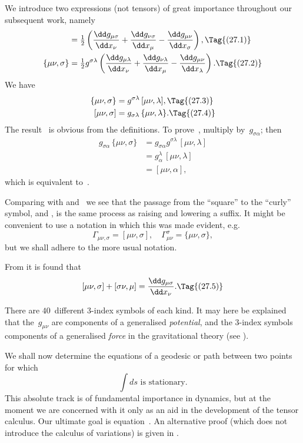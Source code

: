 \documentclass[12pt]{book}
\begin{document}
We introduce two expressions (not tensors) of great importance throughout
our subsequent work, namely
\begin{align*}
  [\mu\nu, \sigma]
  &= \tfrac{1}{2} \left(\frac{\dd g_{\mu\sigma}}{\dd x_{\nu}} + \frac{\dd g_{\nu\sigma}}{\dd x_{\mu}} - \frac{\dd g_{\mu\nu}}{\dd x_{\sigma}}\right),
  \Tag{(27.1)} \\
  \{\mu\nu, \sigma\}
  &= \tfrac{1}{2} g^{\sigma\lambda} \left(\frac{\dd g_{\mu\lambda}}{\dd x_{\nu}} + \frac{\dd g_{\nu\lambda}}{\dd x_{\mu}} - \frac{\dd g_{\mu\nu}}{\dd x_{\lambda}}\right).
\Tag{(27.2)}
\end{align*}
We have
\begin{align*}
  \{\mu\nu, \sigma\} &= g^{\sigma\lambda}\, [\mu\nu, \lambda],
  \Tag{(27.3)} \\
  [\mu\nu, \sigma] &= g_{\sigma\lambda}\, \{\mu\nu, \lambda\}.
  \Tag{(27.4)}
\end{align*}
The result~ is obvious from the definitions. To prove~, multiply 
by~$g_{\sigma\alpha}$; then
\begin{align*}
  g_{\sigma\alpha}\, \{\mu\nu, \sigma\}
  &= g_{\sigma\alpha} g^{\sigma\lambda}\, [\mu\nu, \lambda] \\
  &= g_{\alpha}^{\lambda}\, [\mu\nu, \lambda] \\
  &= [\mu\nu, \alpha],
\end{align*}
which is equivalent to~.

Comparing with  and~ we see that the passage from the
``square'' to the ``curly'' symbol, and , is the same process as raising
and lowering a suffix. It might be convenient to use a notation in which
this was made evident, e.g.\
\[
\Gamma_{\mu\nu, \sigma} = [\mu\nu, \sigma],\quad
\Gamma_{\mu\nu}^{\sigma} = \{\mu\nu, \sigma\},
\]
but we shall adhere to the more usual notation.

From  it is found that
\[
[\mu\nu, \sigma] + [\sigma\nu, \mu] = \frac{\dd g_{\mu\sigma}}{\dd x_{\nu}}.
\Tag{(27.5)}
\]

There are $40$~different $3$-index symbols of each kind. It may here be
explained that the~$g_{\mu\nu}$ are components of a generalised \emph{potential}, and the
\index{Potential!gravitational}%
$3$-index symbols components of a generalised \emph{force} in the gravitational
theory (see \SecRef{55}).


We shall now determine the equations of a geodesic or path between two
points for which
\[
\int ds \text{ is stationary.}
\]
This absolute track is of fundamental importance in dynamics, but at the
moment we are concerned with it only as an aid in the development of the
tensor calculus\footnotemark.\footnotetext
  {Our ultimate goal is equation~. An alternative proof (which does not introduce the
  calculus of variations) is given in \SecRef{31}.}
\end{document}
